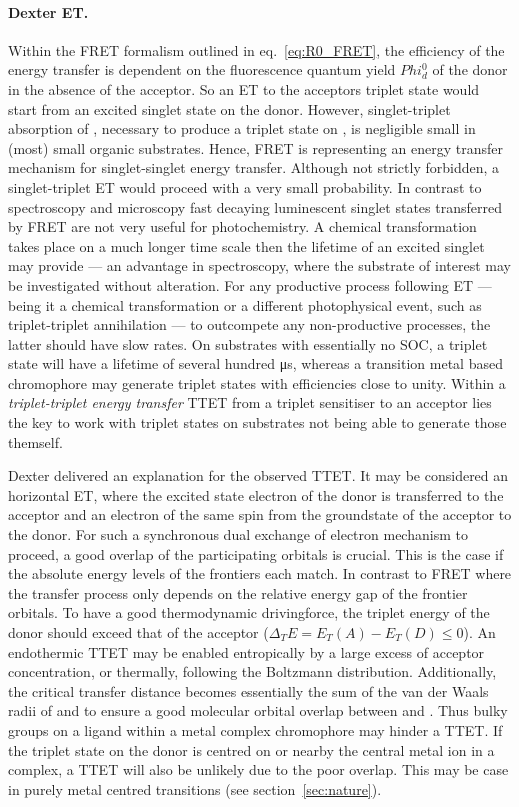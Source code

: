 			\paragraph{Dexter ET.} Within the FRET formalism outlined in eq.~\ref{eq:R0_FRET}, the efficiency of the energy transfer is dependent on the fluorescence quantum yield $Phi^0_d$ of the donor  in the absence of the acceptor. So an ET to the acceptors triplet state would start from an excited singlet state on the donor. However, singlet-triplet absorption of , necessary to produce a triplet state on , is negligible small in (most) small organic substrates. Hence, FRET is representing an energy transfer mechanism for singlet-singlet energy transfer. Although not strictly forbidden, a singlet-triplet ET would proceed with a very small probability. In contrast to spectroscopy and microscopy fast decaying luminescent singlet states transferred by FRET are not very useful for photochemistry. A chemical transformation takes place on a much longer time scale then the lifetime of an excited singlet may provide --- an advantage in spectroscopy, where the substrate of interest may be investigated without alteration. For any productive process following ET --- being it a chemical transformation or  a different photophysical event, such as triplet-triplet annihilation --- to outcompete any non-productive processes, the latter should have slow rates. On substrates with essentially no SOC, a triplet state will have a lifetime of several hundred \unit{\us}, whereas a transition metal based chromophore may generate triplet states with efficiencies close to unity. Within a \emph{triplet-triplet energy transfer} TTET from a triplet sensitiser to an acceptor lies the key to work with triplet states on substrates not being able to generate those themself.

			Dexter delivered an explanation for the observed TTET. It may be considered an horizontal ET, where the excited state electron of the donor is transferred to the acceptor and an electron of the same spin from the groundstate of the acceptor to the donor. For such a synchronous dual exchange of electron mechanism to proceed, a good overlap of the participating orbitals is crucial. This is the case if the absolute energy levels of the frontiers each match. In contrast to FRET where the transfer process only depends on the relative energy gap of the frontier orbitals. To have a good thermodynamic drivingforce, the triplet energy of the donor should exceed that of the acceptor ($\Delta_TE = E_T(A) - E_T(D) \leq 0$). An endothermic TTET may be enabled entropically by a large excess of acceptor concentration,%
			or thermally, following the Boltzmann distribution. Additionally, the critical transfer distance becomes essentially the sum of the van der Waals radii of  and  to ensure a good molecular orbital overlap between  and . Thus bulky groups on a ligand within a metal complex chromophore may hinder a TTET. If the triplet state on the donor is centred on or nearby the central metal ion in a complex, a TTET will also be unlikely due to the poor overlap. This may be case in purely metal centred transitions (see section~\ref{sec:nature}).

